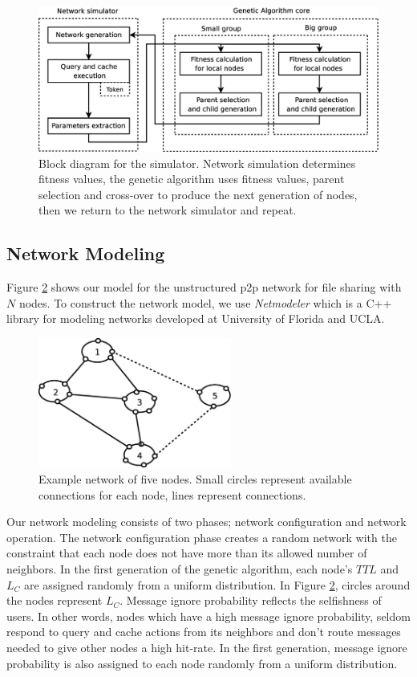 \documentclass[12pt,journal,draftcls,letterpaper,onecolumn]{IEEEtran}
\begin{document}
\begin{figure}
\centering
\includegraphics[width=5.2in]{simblock}
\caption{Block diagram for the simulator.  Network simulation determines fitness values,
the genetic algorithm uses fitness values, parent selection and cross-over to produce the next
generation of nodes, then we return to the network simulator and repeat.} 
\label{fig:simblock}
\end{figure}

\subsection{Network Modeling}\label{sec:netmodel}
Figure \ref{fig:network} shows our model for the unstructured p2p network for file sharing with
$N$ nodes. To construct the network model, we use \emph{Netmodeler} which is a C++ library for
modeling networks developed at University of Florida and UCLA\cite{netmodeler}.

\begin{figure}
\centering
\includegraphics[width=2.5in]{network}
\caption{Example network of five nodes.  Small circles represent available connections
for each node, lines represent connections.} 
\label{fig:network}
\end{figure}

Our network modeling consists of two phases; network configuration and network operation.
The network configuration phase creates a random network with the constraint
that each node does not have more than its allowed number of neighbors.
In the first generation of the genetic algorithm,
each node's $TTL$ and $L_C$ are assigned randomly from a uniform distribution.
In Figure \ref{fig:network},
circles around the nodes represent $L_C$.
Message ignore probability reflects the
selfishness of users. In other words, nodes which have a high message ignore
probability, seldom respond to query and cache actions from its neighbors and
don't route messages needed to give other nodes a high hit-rate.
In the first generation, message ignore
probability is also assigned to each node randomly from a uniform distribution.
\end{document}
